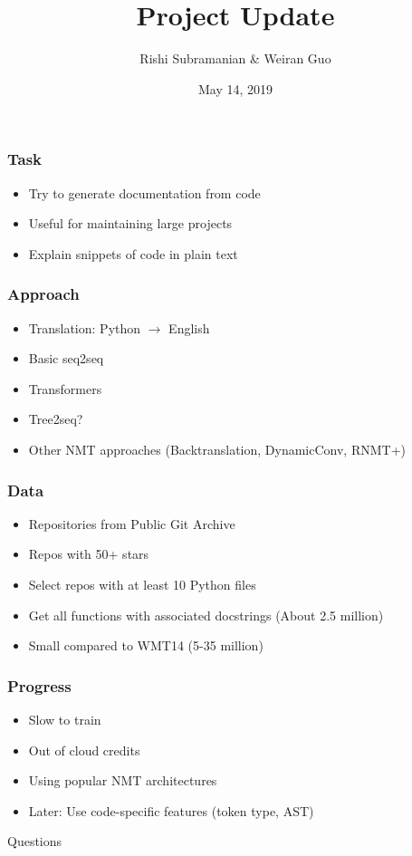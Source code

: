 \documentclass{beamer}
\begin{document}
\title{Project Update}
\author{Rishi Subramanian \& Weiran Guo}
\date{May 14, 2019}

\begin{frame}
  \titlepage
\end{frame}

\begin{frame}
  \frametitle{Task}
  \begin{itemize}
  \item Try to generate documentation from code
  \item Useful for maintaining large projects
  \item Explain snippets of code in plain text
  \end{itemize}
\end{frame}

\begin{frame}
  \frametitle{Approach}
  \begin{itemize}
  \item Translation: Python $\to$ English
  \item Basic seq2seq
  \item Transformers
  \item Tree2seq?
  \item Other NMT approaches (Backtranslation, DynamicConv, RNMT+)
  \end{itemize}
\end{frame}

\begin{frame}
  \frametitle{Data}
  \begin{itemize}
  \item Repositories from Public Git Archive
  \item Repos with 50+ stars
  \item Select repos with at least 10 Python files
  \item Get all functions with associated docstrings (About 2.5 million)
  \item Small compared to WMT14 (5-35 million)
  \end{itemize}
\end{frame}

\begin{frame}
  \frametitle{Progress}
  \begin{itemize}
  \item Slow to train
  \item Out of cloud credits
  \item Using popular NMT architectures
  \item Later: Use code-specific features (token type, AST)
  \end{itemize}
\end{frame}

\begin{frame}[plain,c]
  \begin{center}
    \Huge{Questions}
  \end{center}
  
\end{frame}
\end{document}
